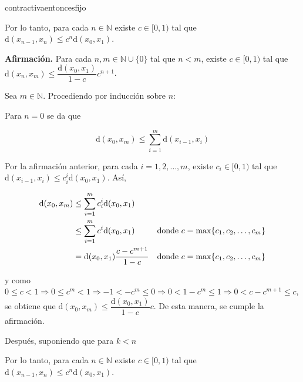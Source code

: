 \documentclass[12pt]{article}
\newenvironment{ejercicio}[1]{\begin{ejer}[breakable, pad at break = 5mm, leftrule = 0.7mm, rightrule = 0.7mm, right = 2mm, left = 2mm, enlarge bottom finally by = 3mm, fontlower = \setlength{\parskip}{2mm}]{}{#1}}{\end{ejer}}
\newcommand{\nat}{\mathbb{N}}
\begin{document}
\begin{ejercicio}{contractivaentoncesfijo}
\begin{minipage}{0.98\linewidth}
			Por lo tanto, para cada $ n \in \nat $ existe $ c \in [0,1) $ tal que $ \mathrm{d} (x_{n-1}, x_n) \leq c^n \mathrm{d} (x_0, x_1) $.
		\end{minipage}

		\textbf{Afirmación.} Para cada $ n, m \in \nat \cup \{0\} $ tal que $ n < m $, existe $ c \in [0,1) $ tal que $ \mathrm{d} (x_n, x_m) \leq \dfrac{\mathrm{d} (x_0, x_1)}{1-c} c^{n+1} $. 

		\hfill \begin{minipage}{0.98\linewidth}
			\setlength{\parskip}{1mm}

			Sea $ m \in \nat $. Procediendo por inducción sobre $ n $:

			Para $ n = 0 $ se da que

			\begin{equation*}
				\mathrm{d} (x_0, x_m) \leq \sum_{i=1}^{m} \mathrm{d} (x_{i-1}, x_i)
			\end{equation*}

			Por la afirmación anterior, para cada $ i = 1, 2, \ldots, m $, existe $ c_i \in [0,1) $ tal que $ \mathrm{d} (x_{i-1}, x_i) \leq c_i^i \mathrm{d} (x_0, x_1) $. Así,

			\begin{align*}
				\mathrm{d} (x_0, x_m) &\leq \sum_{i=1}^{m} c_i^i \mathrm{d} (x_0, x_1) & \\
				&\leq \sum_{i=1}^{m} c^i \mathrm{d} (x_0, x_1) & \mbox{donde $ c = \max \{ c_1, c_2, \ldots, c_m \} $} \\
				&= \mathrm{d} (x_0, x_1) \dfrac{c-c^{m+1}}{1-c} & \mbox{donde $ c = \max \{ c_1, c_2, \ldots, c_m \} $}
			\end{align*}

			y como $ 0 \leq c < 1 \Longrightarrow 0 \leq c^m < 1 \Longrightarrow -1 < -c^m \leq 0 \Longrightarrow 0 < 1 - c^m \leq 1 \Longrightarrow 0 < c - c^{m+1} \leq c $, se obtiene que $ \mathrm{d} (x_0, x_m) \leq \dfrac{\mathrm{d} (x_0, x_1)}{1-c} c $. De esta manera, se cumple la afirmación.

			Después, suponiendo que para $ k < n $

			Por lo tanto, para cada $ n \in \nat $ existe $ c \in [0,1) $ tal que $ \mathrm{d} (x_{n-1}, x_n) \leq c^n \mathrm{d} (x_0, x_1) $.
		\end{minipage}
	\end{ejercicio}
	
\end{document}
